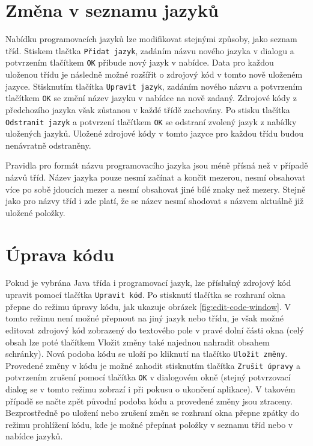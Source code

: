 \documentclass[onepage, a4paper, 12pt]{bakalarka}
\begin{document}
\section{Změna v seznamu jazyků}
Nabídku programovacích jazyků lze modifikovat stejnými způsoby, jako seznam tříd. Stiskem tlačtka \texttt{Přidat jazyk}, zadáním názvu nového jazyka v dialogu a potvrzením tlačítkem \texttt{OK} přibude nový jazyk v nabídce. Data pro každou uloženou třídu je následně možné rozšířit o zdrojový kód v tomto nově uloženém jazyce. Stisknutím tlačítka \texttt{Upravit jazyk}, zadáním nového názvu a potvrzením tlačítkem \texttt{OK} se změní název jazyku v nabídce na nově zadaný. Zdrojové kódy z předchozího jazyka však zůstanou v každé třídě zachovány. Po stisku tlačítka \texttt{Odstranit jazyk} a potvrzení tlačítkem \texttt{OK} se odstraní zvolený jazyk z nabídky uložených jazyků. Uložené zdrojové kódy v tomto jazyce pro každou třídu budou nenávratně odstraněny.\par
Pravidla pro formát názvu programovacího jazyka jsou méně přísná než v případě názvů tříd. Název jazyka pouze nesmí začínat a končit mezerou, nesmí obsahovat více po sobě jdoucích mezer a nesmí obsahovat jiné bílé znaky než mezery. Stejně jako pro názvy tříd i zde platí, že se název nesmí shodovat s názvem aktuálně již uložené položky.

\section{Úprava kódu}
Pokud je vybrána Java třída i programovací jazyk, lze příslušný zdrojový kód upravit pomocí tlačítka \texttt{Upravit kód}. Po stisknutí tlačítka se rozhraní okna přepne do režimu úpravy kódu, jak ukazuje obrázek \ref{fig:edit-code-window}. V tomto režimu není možné přepnout na jiný jazyk nebo třídu, je však možné editovat zdrojový kód zobrazený do textového pole v pravé dolní části okna (celý obsah lze poté tlačítkem Vložit změny také najednou nahradit obsahem schránky). Nová podoba kódu se uloží po kliknutí na tlačítko \texttt{Uložit změny}. Provedené změny v kódu je možné zahodit stisknutím tlačítka \texttt{Zrušit úpravy} a potvrzením zrušení pomocí tlačítka \texttt{OK} v dialogovém okně (stejný potvrzovací dialog se v tomto režimu zobrazí i při pokusu o ukončení aplikace). V takovém případě se načte zpět původní podoba kódu a provedené změny jsou ztraceny. Bezprostředně po uložení nebo zrušení změn se rozhraní okna přepne zpátky do režimu prohlížení kódu, kde je možné přepínat položky v seznamu tříd nebo v nabídce jazyků.
\end{document}

